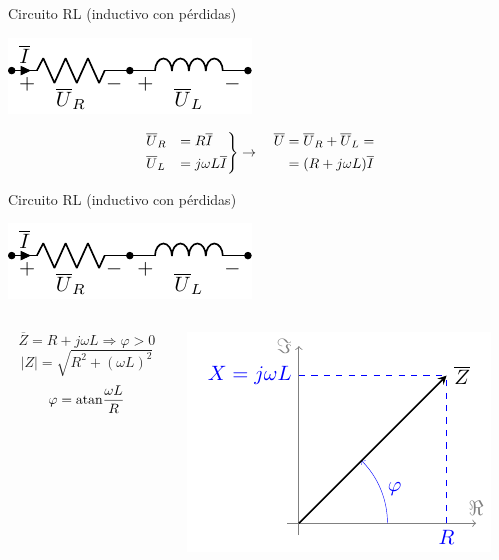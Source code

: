 \documentclass[aspectratio=169, usenames,svgnames,dvipsnames]{beamer}
\begin{document}
\begin{frame}[label={sec:org352744c}]{Circuito RL (inductivo con pérdidas)}
\begin{center}
\includegraphics[height=0.2\textheight]{../figs/RL.pdf}
\end{center}

\[
\begin{rcases}
  \overline{U}_R &= R \overline{I}\\
  \overline{U}_L &= j\omega L \overline{I}
\end{rcases} \rightarrow \quad
    \begin{aligned}
      \overline{U} &= \overline{U}_R + \overline{U}_L =\\
		   &=(R + j\omega L) \overline{I}
    \end{aligned}
\]
\end{frame}
\begin{frame}[label={sec:org3dc2894}]{Circuito RL (inductivo con pérdidas)}
\begin{center}
\includegraphics[height=0.2\textheight]{../figs/RL.pdf}
\end{center}

\begin{columns}
\begin{column}{0.45\columnwidth}
\[
\overline{Z} = R + j\omega L \Rightarrow \boxed{\varphi > 0}
\]
\[
  |Z| = \sqrt{R^2 + (\omega L)^2}
\]
\[
  \varphi = \mathrm{atan}{\dfrac{\omega L}{R}}
\]
\end{column}

\begin{column}{0.55\columnwidth}
\begin{center}
\includegraphics[width=.9\linewidth]{../figs/fasorInductanciaReal.pdf}
\end{center}
\end{column}
\end{columns}
\end{frame}
\end{document}
